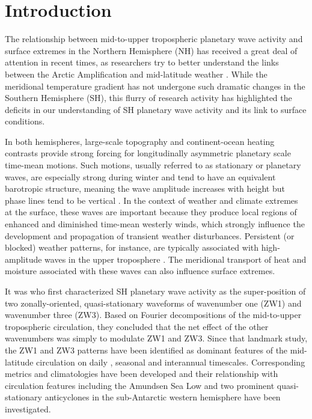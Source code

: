 \section{Introduction}\label{s:introduction}

The relationship between mid-to-upper tropospheric planetary wave activity and surface extremes in the Northern Hemisphere (NH) has received a great deal of attention in recent times, as researchers try to better understand the links between the Arctic Amplification and mid-latitude weather \citep[e.g.][]{Cohen2014,Screen2014}. While the meridional temperature gradient has not undergone such dramatic changes in the Southern Hemisphere (SH), this flurry of research activity has highlighted the deficits in our understanding of SH planetary wave activity and its link to surface conditions. 

In both hemispheres, large-scale topography and continent-ocean heating contrasts provide strong forcing for longitudinally asymmetric planetary scale time-mean motions. Such motions, usually referred to as stationary or planetary waves, are especially strong during winter and tend to have an equivalent barotropic structure, meaning the wave amplitude increases with height but phase lines tend to be vertical \citep{Holton2013}. In the context of weather and climate extremes at the surface, these waves are important because they produce local regions of enhanced and diminished time-mean westerly winds, which strongly influence the development and propagation of transient weather disturbances. Persistent (or blocked) weather patterns, for instance, are typically associated with high-amplitude waves in the upper troposphere \citep[e.g.][]{Trenberth1985,Renwick2005}. The meridional transport of heat and moisture associated with these waves can also influence surface extremes. 

It was \citet{vanLoon1972} who first characterized SH planetary wave activity as the super-position of two zonally-oriented, quasi-stationary waveforms of wavenumber one (ZW1) and wavenumber three (ZW3). Based on Fourier decompositions of the mid-to-upper tropospheric circulation, they concluded that the net effect of the other wavenumbers was simply to modulate ZW1 and ZW3. Since that landmark study, the ZW1 and ZW3 patterns have been identified as dominant features of the mid-latitude circulation on daily \citep[e.g.][]{Kidson1988}, seasonal \citep[e.g.][]{Mo1985} and interannual \citep[e.g.][]{Karoly1989} timescales. Corresponding metrics and climatologies have been developed \citep{Raphael2004,Hobbs2007} and their relationship with circulation features including the Amundsen Sea Low \citep{Turner2013} and two prominent quasi-stationary anticyclones in the sub-Antarctic western hemisphere \citep{Hobbs2010} have been investigated.

